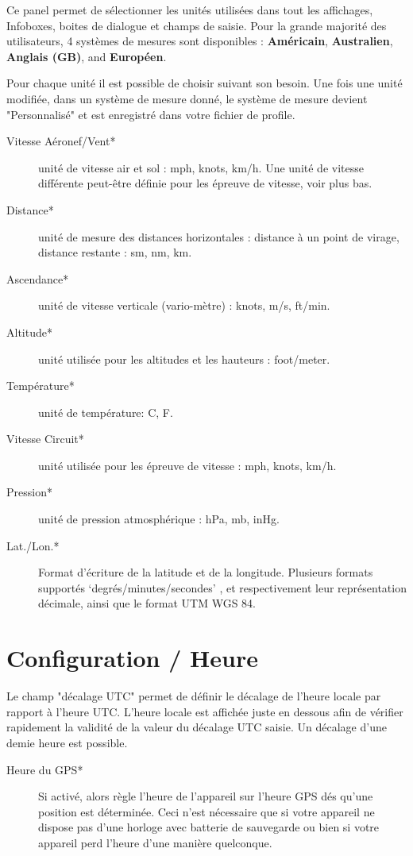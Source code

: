 Ce panel permet de sélectionner les unités utilisées dans tout les affichages, Infoboxes, boites de dialogue et champs de saisie. Pour la grande majorité des utilisateurs, 4 systèmes de mesures sont disponibles : {\bf Américain}, {\bf Australien}, {\bf Anglais (GB)}, and {\bf Européen}.

Pour chaque unité il est possible de choisir suivant son besoin. Une fois une unité modifiée, dans un système de mesure donné, le système de mesure devient "Personnalisé" et est enregistré dans votre fichier de profile.

\begin{description}
\item[Vitesse Aéronef/Vent*]  unité de vitesse air et sol : mph, knots, km/h. Une unité de vitesse différente peut-être définie pour les épreuve de vitesse, voir plus bas.
\item[Distance*]  unité de mesure des distances horizontales : distance à un point de virage, distance restante : sm, nm, km.
\item[Ascendance*]  unité de vitesse verticale (vario-mètre) : knots, m/s, ft/min.
\item[Altitude*] unité utilisée pour les altitudes et les hauteurs : foot/meter.
\item[Température*]  unité de température: \degree C, \degree F.
\item[Vitesse Circuit*] unité utilisée pour les épreuve de vitesse : mph, knots, km/h.
\item[Pression*]  unité de pression atmosphérique : hPa, mb, inHg.
\item[Lat./Lon.*]  Format d'écriture de la latitude et de la longitude. Plusieurs formats supportés  `degrés/minutes/secondes' , et respectivement leur représentation décimale, ainsi que le format UTM WGS 84.
\end{description}


\section{Configuration / Heure}

Le champ "décalage UTC" permet de définir le décalage de l'heure locale par rapport à l'heure UTC.
L'heure locale est affichée juste en dessous afin de vérifier rapidement la validité de la valeur du décalage UTC saisie. Un décalage d'une demie heure est possible.

\begin{description}
\item[Heure du GPS*] Si activé, alors règle l'heure de l'appareil sur l'heure GPS dés qu'une position est déterminée. Ceci n'est nécessaire que si votre appareil ne dispose pas d'une horloge avec batterie de sauvegarde ou bien si votre appareil perd l'heure d'une manière quelconque.
\end{description}


